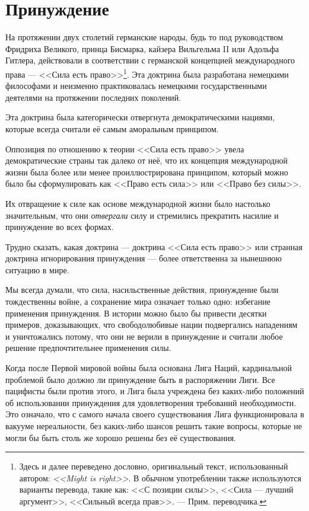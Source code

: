 \chapter{Принуждение}

На протяжении двух столетий германские народы, будь то под руководством Фридриха Великого, принца Бисмарка, кайзера Вильгельма II или Адольфа Гитлера, действовали в соответствии с германской концепцией международного права — <<Сила есть право>>\footnote{%
Здесь и далее переведено дословно, оригинальный текст, использованный автором: \textit{<<Might is right>>}. В обычном употреблении также используются варианты перевода, такие как: <<С позиции силы>>, <<Сила — лучший аргумент>>, <<Сильный всегда прав>>. — Прим. переводчика.}. Эта доктрина была разработана немецкими философами и неизменно практиковалась немецкими государственными деятелями на протяжении последних поколений.
 
Эта доктрина была категорически отвергнута демократическими нациями, которые всегда считали её самым аморальным принципом.

Оппозиция по отношению к теории <<Сила есть право>> увела демократические страны так далеко от неё, что их концепция международной жизни была более или менее проиллюстрирована принципом, который можно было бы сформулировать как <<Право есть сила>> или <<Право без силы>>.

Их отвращение к силе как основе международной жизни было настолько значительным, что они \textit{отвергали} силу и стремились прекратить насилие и принуждение во всех формах.

Трудно сказать, какая доктрина — доктрина <<Сила есть право>> или странная доктрина игнорирования принуждения — более ответственна за нынешнюю ситуацию в мире.

Мы всегда думали, что сила, насильственные действия, принуждение были тождественны войне, а сохранение мира означает только одно: избегание применения принуждения. В истории можно было бы привести десятки примеров, доказывающих, что свободолюбивые нации подвергались нападениям и уничтожались потому, что они не верили в принуждение и считали любое решение предпочтительнее применения силы.

Когда после Первой мировой войны была основана Лига Наций, кардинальной проблемой было должно ли принуждение быть в распоряжении Лиги. Все пацифисты были против этого, и Лига была учреждена без каких-либо положений об использовании принуждения для удовлетворения требований необходимости. Это означало, что с самого начала своего существования Лига функционировала в вакууме нереальности, без каких-либо шансов решить такие вопросы, которые не могли бы быть столь же хорошо решены без её существования.

